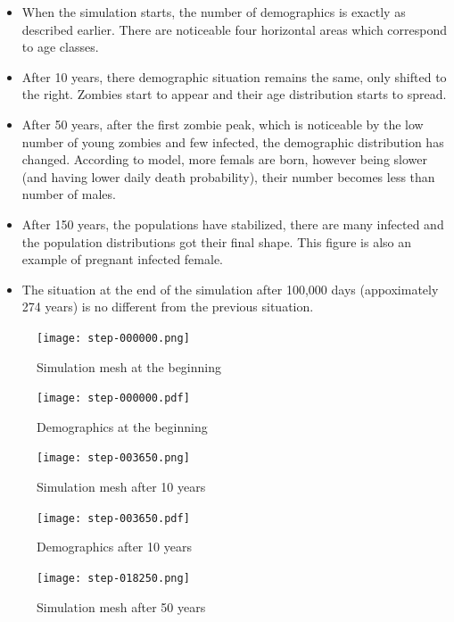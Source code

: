 \documentclass[a4paper]{article}
\begin{document}
\begin{itemize}
\item When the simulation starts, the number of demographics is exactly as described earlier.
    There are noticeable four horizontal areas which correspond to age classes.
\item After 10 years, there demographic situation remains the same, only shifted to the right.
    Zombies start to appear and their age distribution starts to spread.
\item After 50 years, after the first zombie peak, which is noticeable by the low number of young zombies and few infected, the demographic distribution has changed.
    According to model, more femals are born, however being slower (and having lower daily death probability), their number becomes less than number of males.
\item After 150 years, the populations have stabilized, there are many infected and the population distributions got their final shape.
    This figure is also an example of pregnant infected female.
\item The situation at the end of the simulation after 100,000 days (appoximately 274 years) is no different from the previous situation.
\end{itemize}

\begin{figure}[pht]
    \centering
    \texttt{[image: step-000000.png]}
    \caption{Simulation mesh at the beginning}
\end{figure}

\begin{figure}[pht]
    \centering
    \texttt{[image: step-000000.pdf]}
    \caption{Demographics at the beginning}
\end{figure}

\begin{figure}[pht]
    \centering
    \texttt{[image: step-003650.png]}
    \caption{Simulation mesh after 10 years}
\end{figure}

\begin{figure}[pht]
    \centering
    \texttt{[image: step-003650.pdf]}
    \caption{Demographics after 10 years}
\end{figure}

\begin{figure}[pht]
    \centering
    \texttt{[image: step-018250.png]}
    \caption{Simulation mesh after 50 years}
\end{figure}
\end{document}
